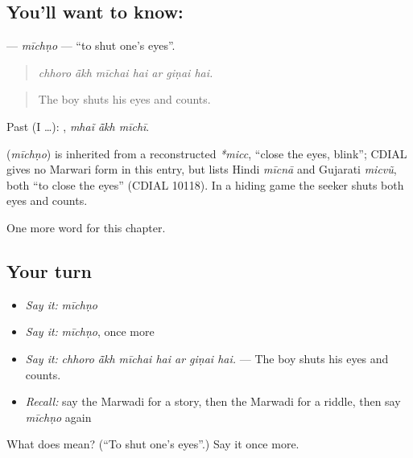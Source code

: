 \subsection*{You'll want to know: }
\textbf{} — \emph{mīchṇo} — \textquotedblleft{}to shut one's eyes\textquotedblright{}.

\begin{quote}
      
\end{quote}

\begin{quote}
\emph{chhoro ā̃kh mīchai hai ar giṇai hai.}
\end{quote}

\begin{quote}
The boy shuts his eyes and counts.
\end{quote}

Past (I …):   , \emph{mhaĩ ā̃kh mīchī}.

\begin{cousinweb}
\textbf{} (\emph{mīchṇo}) is inherited from a reconstructed \emph{*micc}, \textquotedblleft{}close the eyes, blink\textquotedblright{}; CDIAL gives no Marwari form in this entry, but lists Hindi \emph{mīcnā} and Gujarati \emph{micvũ}, both \textquotedblleft{}to close the eyes\textquotedblright{} (CDIAL 10118). In a hiding game the seeker shuts both eyes and counts.
\end{cousinweb}

\begin{grammarlens}[title={What you've built}]
One more word for this chapter.
\end{grammarlens}

\subsection*{Your turn}
\begin{itemize}
\raggedright
  \item \emph{Say it:} \emph{mīchṇo}
  \item \emph{Say it:} \emph{mīchṇo}, once more
  \item \emph{Say it:} \emph{chhoro ā̃kh mīchai hai ar giṇai hai.} — The boy shuts his eyes and counts.
  \item \emph{Recall:} say the Marwadi for a story, then the Marwadi for a riddle, then say \emph{mīchṇo} again
\end{itemize}

\begin{tcolorbox}[breakable,colback=teal!4,colframe=teal!35!black,title={Before you move on}]
What does  mean? (\textquotedblleft{}To shut one's eyes\textquotedblright{}.) Say it once more.
\end{tcolorbox}
